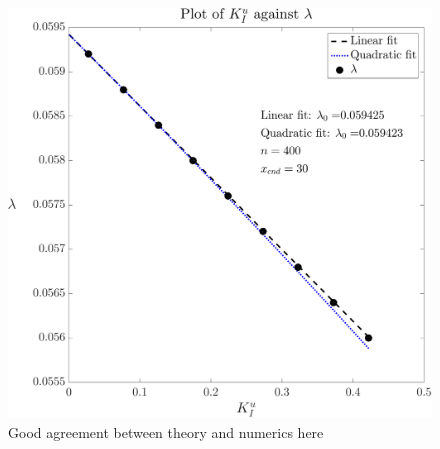\documentclass{jfm}
\begin{document}
\begin{figure}
  \centerline{\includegraphics[scale=0.3]{./../../Graphs/l0.pdf}}
  \caption{Good agreement between theory and numerics here}
\end{figure}
\end{document}
